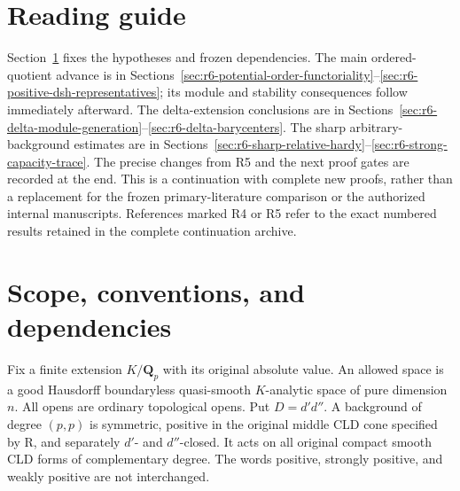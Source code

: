\documentclass[11pt,a4paper]{article}
\numberwithin{equation}{section}
\theoremstyle{definition}
\theoremstyle{remark}
\begin{document}
\begin{abstract}
For Dirichlet theory, completed degree-one feasibility has an exact
energy-dual criterion, while higher-degree variation criteria retain
explicit feasibility hypotheses. Counterexamples rule out unrestricted
relative Hessian root concavity and show that the actual zero-boundary
classical Monge--Ampere image can be nonconvex in every remaining degree
at least two, even for sums of smooth analytic-subspace integration
currents. All new proofs, direct consequences, failed routes and
unresolved gates have separate status labels.
\end{abstract}
\section*{Reading guide}
Section~\ref{sec:r6-inputs} fixes the hypotheses and frozen dependencies.
The main ordered-quotient advance is in
Sections~\ref{sec:r6-potential-order-functoriality}--\ref{sec:r6-positive-dsh-representatives};
its module and stability consequences follow immediately afterward.
The delta-extension conclusions are in
Sections~\ref{sec:r6-delta-module-generation}--\ref{sec:r6-delta-barycenters}.
The sharp arbitrary-background estimates are in
Sections~\ref{sec:r6-sharp-relative-hardy}--\ref{sec:r6-strong-capacity-trace}.
The precise changes from R5 and the next proof gates are recorded at
the end. This is a continuation with complete new proofs, rather than
a replacement for the frozen primary-literature comparison or the
authorized internal manuscripts. References marked R4 or R5 refer to
the exact numbered results retained in the complete continuation archive.
\tableofcontents
\clearpage

\section{Scope, conventions, and dependencies}
\label{sec:r6-inputs}

Fix a finite extension $K/\mathbf Q_p$ with its original absolute
value. An allowed space is a good Hausdorff boundaryless quasi-smooth
$K$-analytic space of pure dimension $n$. All opens are ordinary
topological opens. Put $D=d'd''$. A background of degree $(p,p)$ is
symmetric, positive in the original middle CLD cone specified by R,
and separately $d'$- and $d''$-closed. It acts on all original compact
smooth CLD forms of complementary degree. The words positive,
strongly positive, and weakly positive are not interchanged.
\end{document}

